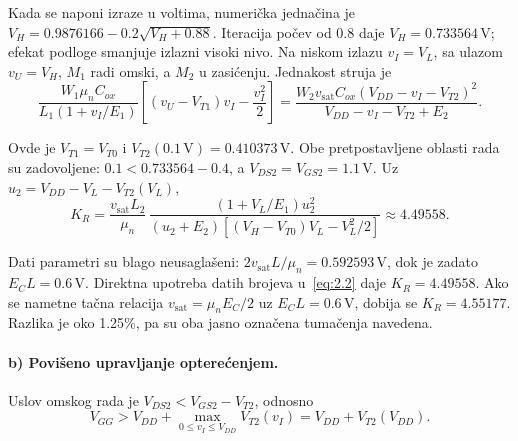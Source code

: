 \documentclass[a4paper,11pt]{article}
\numberwithin{equation}{section}
\newcommand{\napomena}[1]{\begin{tcolorbox}[colback=gray!10,colframe=black,boxrule=0.5pt,breakable]#1\end{tcolorbox}}
\begin{document}
Kada se naponi izraze u voltima, numerička jednačina je $V_H=0.9876166-0.2\sqrt{V_H+0.88}$. Iteracija počev od $0.8$ daje $V_H=0.733564\,\mathrm V$; efekat podloge smanjuje izlazni visoki nivo.
Na niskom izlazu $v_I=V_L$, sa ulazom $v_U=V_H$, $M_1$ radi omski, a $M_2$ u zasićenju. Jednakost struja je
\begin{equation}\label{eq:2.2}
\frac{W_1\mu_nC_{ox}}{L_1(1+v_I/E_1)}\left[(v_U-V_{T1})v_I-\frac{v_I^2}{2}\right]=\frac{W_2v_{\mathrm{sat}}C_{ox}(V_{DD}-v_I-V_{T2})^2}{V_{DD}-v_I-V_{T2}+E_2}.
\end{equation}

Ovde je $V_{T1}=V_{T0}$ i $V_{T2}(0.1\,\mathrm V)=0.410373\,\mathrm V$. Obe pretpostavljene oblasti rada su zadovoljene: $0.1<0.733564-0.4$, a $V_{DS2}=V_{GS2}=1.1\,\mathrm V$. Uz $u_2=V_{DD}-V_L-V_{T2}(V_L)$,
\begin{equation}\label{eq:2.5}
K_R=\frac{v_{\mathrm{sat}}L_2}{\mu_n}\,\frac{(1+V_L/E_1)u_2^2}{(u_2+E_2)[(V_H-V_{T0})V_L-V_L^2/2]}\approx4.49558.
\end{equation}

\napomena{Dati parametri su blago neusaglašeni: $2v_{\mathrm{sat}}L/\mu_n=0.592593\,\mathrm V$, dok je zadato $E_CL=0.6\,\mathrm V$. Direktna upotreba datih brojeva u~\eqref{eq:2.2} daje $K_R=4.49558$. Ako se nametne tačna relacija $v_{\mathrm{sat}}=\mu_nE_C/2$ uz $E_CL=0.6\,\mathrm V$, dobija se $K_R=4.55177$. Razlika je oko 1.25\%, pa su oba jasno označena tumačenja navedena.}
\FloatBarrier{}\paragraph{b) Povišeno upravljanje opterećenjem.}
Uslov omskog rada je $V_{DS2}<V_{GS2}-V_{T2}$, odnosno
\begin{equation}\label{eq:2.3}
V_{GG}>V_{DD}+\max_{0\le v_I\le V_{DD}}V_{T2}(v_I)=V_{DD}+V_{T2}(V_{DD}).
\end{equation}
\end{document}
